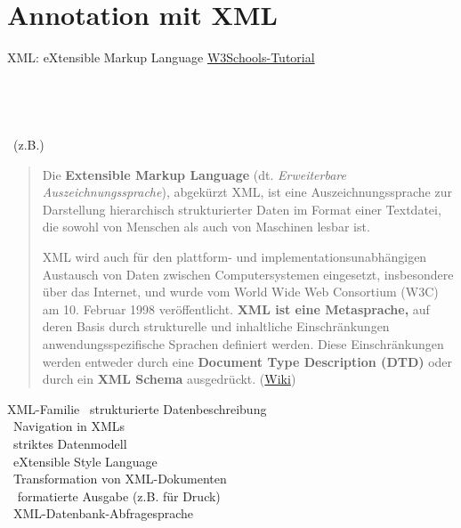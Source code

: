 \section{Annotation mit XML}
\begin{frame}[allowframebreaks]{XML: eXtensible Markup Language}
\href{https://www.w3schools.com/xml/default.asp}{W3Schools-Tutorial} \\
 ~
\\
\\
~~
~~\\
~~~
~~\\
~(z.B.)

\begin{quote}
    Die \textbf{Extensible Markup Language} (dt. \emph{Erweiterbare Auszeichnungssprache}), abgekürzt XML, ist eine Auszeichnungssprache zur Darstellung hierarchisch strukturierter Daten im Format einer Textdatei, die sowohl von Menschen als auch von Maschinen lesbar ist.

XML wird auch für den plattform- und implementationsunabhängigen Austausch von Daten zwischen Computersystemen eingesetzt, insbesondere über das Internet, und wurde vom World Wide Web Consortium (W3C) am 10. Februar 1998 veröffentlicht. \punkti \textbf{XML ist eine Metasprache,} auf deren Basis durch strukturelle und inhaltliche Einschränkungen anwendungsspezifische Sprachen definiert werden. Diese Einschränkungen werden entweder durch eine \textbf{Document Type Description (DTD)} oder durch ein \textbf{XML Schema} ausgedrückt.  (\href{https://de.wikipedia.org/wiki/Extensible_Markup_Language}{Wiki})
\end{quote}
\end{frame}

\begin{frame}[allowframebreaks]{XML-Familie}
\footnotesize
{}~strukturierte Datenbeschreibung \\
~Navigation in XMLs \\
~striktes Datenmodell \\
~eXtensible Style Language \\
~Transformation von XML-Dokumenten  \\
~ formatierte Ausgabe (z.B. für Druck) \\
~XML-Datenbank-Abfragesprache \\
~
\end{frame}


